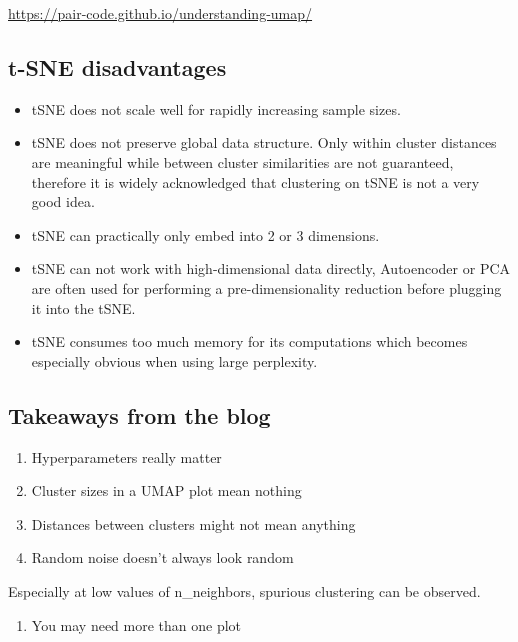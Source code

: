 \documentclass[
]{article}
\providecommand{\tightlist}{%
  \setlength{\itemsep}{0pt}\setlength{\parskip}{0pt}}
\begin{document}
\url{https://pair-code.github.io/understanding-umap/}

\hypertarget{t-sne-disadvantages}{%
\subsection{t-SNE disadvantages}\label{t-sne-disadvantages}}

\begin{itemize}
\item
  tSNE does not scale well for rapidly increasing sample sizes.
\item
  tSNE does not preserve global data structure. Only within cluster distances are meaningful while between cluster similarities are not guaranteed, therefore it is widely acknowledged that clustering on tSNE is not a very good idea.
\item
  tSNE can practically only embed into 2 or 3 dimensions.
\item
  tSNE can not work with high-dimensional data directly, Autoencoder or PCA are often used for performing a pre-dimensionality reduction before plugging it into the tSNE.
\item
  tSNE consumes too much memory for its computations which becomes especially obvious when using large perplexity.
\end{itemize}

\hypertarget{takeaways-from-the-blog}{%
\subsection{Takeaways from the blog}\label{takeaways-from-the-blog}}

\begin{enumerate}
\def\labelenumi{\arabic{enumi}.}
\item
  Hyperparameters really matter
\item
  Cluster sizes in a UMAP plot mean nothing
\item
  Distances between clusters might not mean anything
\item
  Random noise doesn't always look random
\end{enumerate}

Especially at low values of n\_neighbors, spurious clustering can be observed.

\begin{enumerate}
\def\labelenumi{\arabic{enumi}.}
\setcounter{enumi}{4}
\tightlist
\item
  You may need more than one plot
\end{enumerate}
\end{document}
